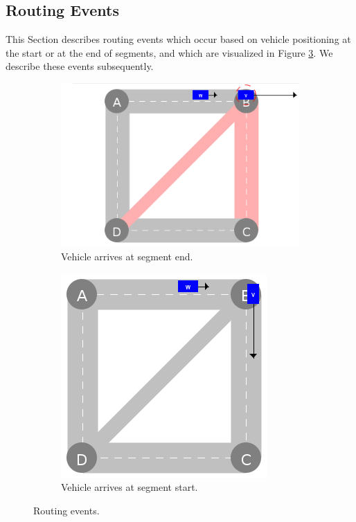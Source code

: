 \documentclass[graybox]{svmult}
\begin{document}
\subsection{Routing Events}
\label{sec:routing-events}
This Section describes routing events which occur based on vehicle positioning at the start or at the end of segments, and which are visualized in Figure \ref{fig:routing-events}. We describe these events subsequently.

\vspace{4mm}
\begin{figure}
	\centering
	\begin{subfigure}{.45\textwidth}
		\centering
		\includegraphics[scale=0.35]{../../events/vehicle-at-intersection-before.png}
		\caption{Vehicle arrives at segment end.}
		\label{fig:vehicle-at-intersection-before}
	\end{subfigure}
	\begin{subfigure}{.45\textwidth}
		\centering
		\includegraphics[scale=0.35]{../../events/vehicle-at-intersection-after.png}
		\caption{Vehicle arrives at segment start.}
		\label{fig:vehicle-at-intersection-after}
	\end{subfigure}
	\caption{Routing events.}
		\label{fig:routing-events}
\end{figure}
\end{document}
